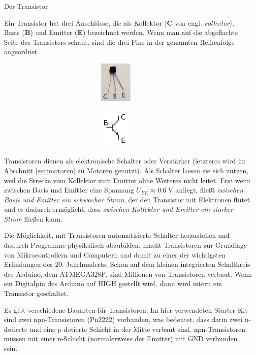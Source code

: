 \begin{zsfg}{Der Transistor}
	
	\medskip
	\begin{minipage}{0.7\textwidth}
		Ein Transistor hat drei Anschlüsse, die als Kollektor (\textbf{C} von engl. \emph{collector}), Basis (\textbf{B}) und Emitter (\textbf{E}) bezeichnet werden. Wenn man auf die abgeflachte Seite des Transistors schaut, sind die drei Pins in der genannten Reihenfolge angeordnet.
	\end{minipage}
	\hfill
	\begin{minipage}{0.28\textwidth}
		\begin{minipage}{0.48\textwidth}
			\centering
			\includegraphics[width=0.9\textwidth, height=2cm]{./pics/transistor.jpg}
		\end{minipage}
		\hfill
		\begin{minipage}{0.48\textwidth}
			\centering
			\includegraphics[width=0.9\textwidth, height=2cm]{./pics/transistor-schaltsymbol.png}
		\end{minipage}
	\end{minipage}
	
	\medskip
	Transistoren dienen als elektronische Schalter oder Verstärker (letzteres wird im Abschnitt \ref{sec:motoren} zu Motoren genutzt). Als Schalter lassen sie sich nutzen, weil die Strecke vom Kollektor zum Emitter ohne Weiteres nicht leitet. Erst wenn zwischen Basis und Emitter eine Spannung $U_{BE} \approx \SI{0,6}{\volt}$ anliegt, fließt \emph{zwischen Basis und Emitter ein schwacher Strom}, der den Transistor mit Elektronen flutet und es dadurch ermöglicht, dass \emph{zwischen Kollektor und Emitter ein starker Strom} fließen kann.
	
	Die Möglichkeit, mit Transistoren automatisierte Schalter herzustellen und dadurch Programme physikalisch abzubilden, macht Transistoren zur Grundlage von Mikrocontrollern und Computern und damit zu einer der wichtigsten Erfindungen des 20. Jahrhunderts. Schon auf dem kleinen integrierten Schaltkreis des Arduino, dem ATMEGA328P, sind Millionen von Transistoren verbaut. Wenn ein Digitalpin des Arduino auf HIGH gestellt wird, dann wird intern ein Transistor geschaltet.
	
	Es gibt verschiedene Bauarten für Transistoren. Im hier verwendeten Starter Kit sind zwei npn-Transistoren (Pn2222) vorhanden, was bedeutet, dass darin zwei n-dotierte und eine p-dotierte Schicht in der Mitte verbaut sind. npn-Transistoren müssen mit einer n-Schicht (normalerweise der Emitter) mit GND verbunden sein.
\end{zsfg}

